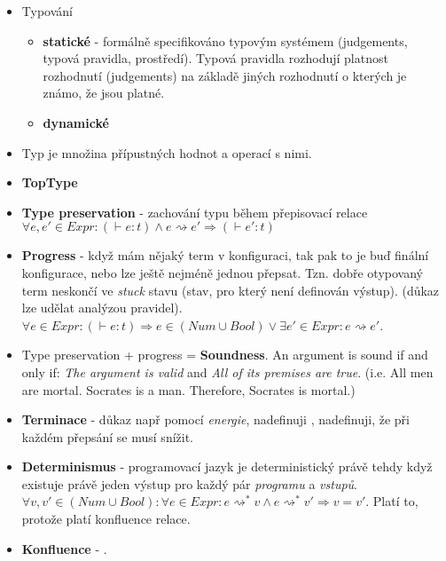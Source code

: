 \begin{itemize}[itemsep=0px]
\item Typování
\begin{itemize}
\item \textbf{statické} - formálně specifikováno typovým systémem (judgements, typová pravidla, prostředí). Typová pravidla rozhodují platnost rozhodnutí (judgements) na základě jiných rozhodnutí o kterých je známo, že jsou platné.
\item \textbf{dynamické}
\end{itemize}
\item Typ je množina přípustných hodnot a operací s nimi.
\item \textbf{TopType}
\item \textbf{Type preservation} - zachování typu během přepisovací relace $\forall e,e'\in Expr:(\vdash e:t) \wedge e \rightsquigarrow e' \Rightarrow (\vdash e':t)$
\item \textbf{Progress} - když mám nějaký term v konfiguraci, tak pak to je buď finální konfigurace, nebo lze ještě nejméně jednou přepsat. Tzn. dobře otypovaný term neskončí ve \textit{stuck} stavu (stav, pro který není definován výstup). (důkaz lze udělat analýzou pravidel). $\forall e \in Expr: (\vdash e:t) \Rightarrow e \in (Num \cup Bool) \vee \exists e' \in Expr: e \rightsquigarrow e'$.
\item Type preservation + progress = \textbf{Soundness}. An argument is sound if and only if: \textit{The argument is valid} and \textit{All of its premises are true}. (i.e. All men are mortal. Socrates is a man. Therefore, Socrates is mortal.)
\item \textbf{Terminace} - důkaz např pomocí \textit{energie}, nadefinuji , nadefinuji, že při každém přepsání se musí snížit.
\item \textbf{Determinismus} - programovací jazyk je deterministický právě tehdy když existuje právě jeden výstup pro každý pár \textit{programu} a \textit{vstupů}.
$\forall v,v' \in (Num \cup Bool): \forall e \in Expr : e \rightsquigarrow^* v \wedge e \rightsquigarrow^* v' \Rightarrow v = v'$. Platí to, protože platí konfluence relace.
\item \textbf{Konfluence} - .
\end{itemize}

